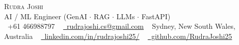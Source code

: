 \documentclass[letterpaper,11pt]{article}
\begin{document}
\begin{center}
    {\huge \scshape Rudra Joshi} \\ \vspace{2pt}
    \small AI / ML Engineer (GenAI $\cdot$ RAG $\cdot$ LLMs $\cdot$ FastAPI) \\ \vspace{4pt}
    \small \raisebox{-0.1\height}\faPhone\ +61 466988797 ~
    \href{mailto:rudrajoshi.cs@gmail.com}{\raisebox{-0.2\height}\faEnvelope\ rudrajoshi.cs@gmail.com} ~
    Sydney, New South Wales, Australia ~
    \href{https://www.linkedin.com/in/rudrajoshi25/}{\raisebox{-0.2\height}\faLinkedin\ linkedin.com/in/rudrajoshi25/} ~
    \href{https://github.com/RudraJoshi25}{\raisebox{-0.2\height}\faGithub\ github.com/RudraJoshi25}
    \vspace{-8pt}
\end{center}

\vspace{-16pt}



\end{document}
